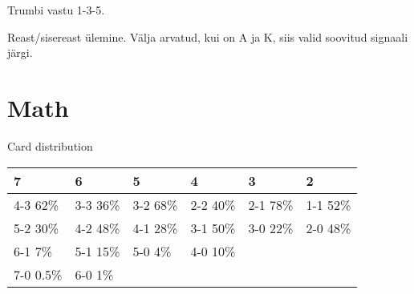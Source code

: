 \documentclass[10pt]{article}
\begin{document}
\begin{multicols*}{2}
Trumbi vastu 1-3-5.

Reast/sisereast ülemine. Välja arvatud, kui on A ja K, siis valid soovitud signaali järgi.


\section{Math}

Card distribution
\begin{table}[h]
  \begin{tabular}[h]{l|l|l|l|l|l}
    7         & 6        & 5        & 4        & 3        & 2        \\
    \hline
    4-3 62\%  & 3-3 36\% & 3-2 68\% & 2-2 40\% & 2-1 78\% & 1-1 52\% \\
    5-2 30\%  & 4-2 48\% & 4-1 28\% & 3-1 50\% & 3-0 22\% & 2-0 48\% \\
    6-1 7\%   & 5-1 15\% & 5-0 4\%  & 4-0 10\% &                     \\
    7-0 0.5\% & 6-0 1\%  &                                           \\

  \end{tabular}
\end{table}

\end{multicols*}
\end{document}
